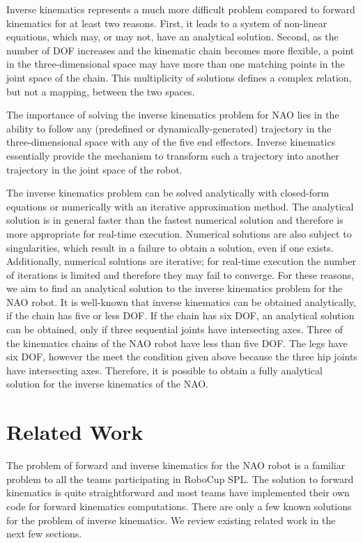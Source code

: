 Inverse kinematics represents a much more difficult problem compared to forward kinematics for at least two reasons. First, it leads to a system of non-linear equations, which may, or may not, have an analytical solution. Second, as the number of DOF increases and the kinematic chain becomes more flexible, a point in the three-dimensional space may have more than one matching points in the joint space of the chain. This multiplicity of solutions defines a complex relation, but not a mapping, between the two spaces.

The importance of solving the inverse kinematics problem for NAO lies in the ability to follow any (predefined or dynamically-generated) trajectory in the three-dimensional space with any of the five end effectors. Inverse kinematics essentially provide the mechanism to transform such a trajectory into another trajectory in the joint space of the robot. 

The inverse kinematics problem can be solved analytically with closed-form equations or numerically with an iterative approximation method. The analytical solution is in general faster than the fastest numerical solution and therefore is more appropriate for real-time execution. Numerical solutions are also subject to singularities, which result in a failure to obtain a solution, even if one exists. Additionally, numerical solutions are iterative; for real-time execution the number of iterations is limited and therefore they may fail to converge. For these reasons, we aim to find an analytical solution to the inverse kinematics problem for the NAO robot. It is well-known that inverse kinematics can be obtained analytically, if the chain has five or less DOF. If the chain has six DOF, an analytical solution can be obtained, only if three sequential joints have intersecting axes. Three of the kinematics chains of the NAO robot have less than five DOF. The legs have six DOF, however the meet the condition given above because the three hip joints have intersecting axes. Therefore, it is possible to obtain a fully analytical solution for the inverse kinematics of the NAO. 


\section{Related Work}

The problem of forward and inverse kinematics for the NAO robot is a familiar problem to all the teams participating in RoboCup SPL. The solution to forward kinematics is quite straightforward and most teams have implemented their own code for forward kinematics computations. There are only a few known solutions for the problem of inverse kinematics. We review existing related work in the next few sections. 

